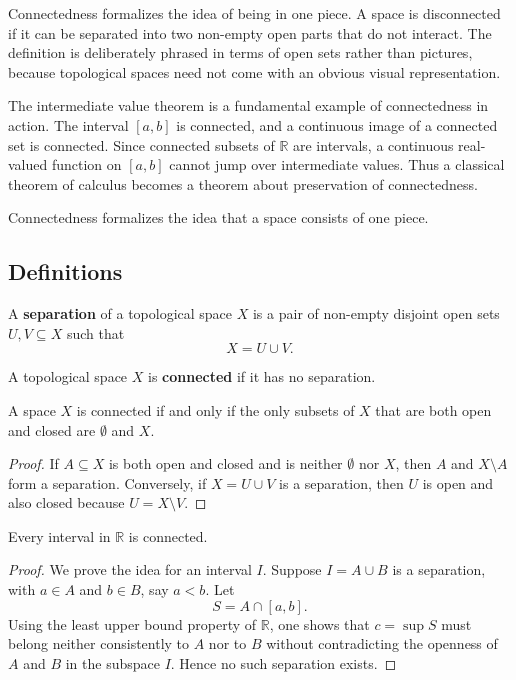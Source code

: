Connectedness formalizes the idea of being in one piece. A space is disconnected if it can be separated into two non-empty open parts that do not interact. The definition is deliberately phrased in terms of open sets rather than pictures, because topological spaces need not come with an obvious visual representation.

The intermediate value theorem is a fundamental example of connectedness in action. The interval $[a,b]$ is connected, and a continuous image of a connected set is connected. Since connected subsets of $\mathbb{R}$ are intervals, a continuous real-valued function on $[a,b]$ cannot jump over intermediate values. Thus a classical theorem of calculus becomes a theorem about preservation of connectedness.

Connectedness formalizes the idea that a space consists of one piece.

\subsection{Definitions}

\begin{definition}[Separation]
A \textbf{separation} of a topological space $X$ is a pair of non-empty disjoint open sets $U,V\subseteq X$ such that
\[
    X=U\cup V.
\]
\end{definition}

\begin{definition}
A topological space $X$ is \textbf{connected} if it has no separation.
\end{definition}

\begin{proposition}
A space $X$ is connected if and only if the only subsets of $X$ that are both open and closed are $\emptyset$ and $X$.
\end{proposition}

\begin{proof}
If $A\subseteq X$ is both open and closed and is neither $\emptyset$ nor $X$, then $A$ and $X\setminus A$ form a separation. Conversely, if $X=U\cup V$ is a separation, then $U$ is open and also closed because $U=X\setminus V$.
\end{proof}

\begin{theorem}
Every interval in $\mathbb{R}$ is connected.
\end{theorem}

\begin{proof}
We prove the idea for an interval $I$. Suppose $I=A\cup B$ is a separation, with $a\in A$ and $b\in B$, say $a<b$. Let
\[
    S=A\cap [a,b].
\]
Using the least upper bound property of $\mathbb{R}$, one shows that $c=\sup S$ must belong neither consistently to $A$ nor to $B$ without contradicting the openness of $A$ and $B$ in the subspace $I$. Hence no such separation exists.
\end{proof}

